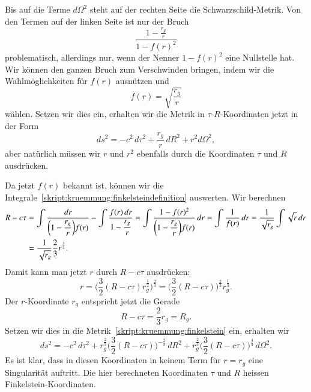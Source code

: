 Bis auf die Terme $d\Omega^2$ steht auf der rechten Seite die
Schwarzschild-Metrik.
Von den Termen auf der linken Seite ist nur der Bruch
\[
\frac{\displaystyle 1-\frac{r_g}{r}}{1-f(r)^2}
\]
problematisch, allerdings nur, wenn der Nenner $1-f(r)^2$ eine
Nullstelle hat.
Wir können den ganzen Bruch zum Verschwinden bringen, indem wir die
Wahlmöglichkeiten für $f(r)$ ausnützen und 
\[
f(r)=\sqrt{\frac{r_g}{r}}
\]
wählen.
Setzen wir dies ein, erhalten wir die Metrik in $\tau$-$R$-Koordinaten
jetzt in der Form
\begin{equation}
ds^2
=
-c^2\,d\tau^2 + \frac{r_g}{r}\,dR^2 + r^2 d\Omega^2,
\label{skript:kruemmung:finkelstein}
\end{equation}
aber natürlich müssen wir $r$ und $r^2$ ebenfalls durch die Koordinaten
$\tau$ und $R$ ausdrücken.

Da jetzt $f(r)$ bekannt ist, können wir die
Integrale~\eqref{skript:kruemmung:finkelsteindefinition} auswerten.
Wir berechnen
\begin{align*}
R-c\tau
&=
\int\frac{dr}{\displaystyle \biggl(1-\frac{r_g}{r}\biggr)f(r)}
- \int\frac{f(r)\,dr}{\displaystyle 1-\frac{r_g}{r}}
=
\int\frac{1-f(r)^2}{\displaystyle\biggl(1-\frac{r_g}{r}\biggr) f(r)}\,dr
=
\int\frac{1}{f(r)}\,dr
=
\frac{1}{\sqrt{\mathstrut r_g}}\int\sqrt{\mathstrut r}\,dr
\\
&=
\frac{1}{\sqrt{\mathstrut r_g}} \frac{2}{3}r^{\frac{3}{2}}.
\end{align*}
Damit kann man jetzt $r$ durch $R-c\tau$ ausdrücken:
\begin{equation}
r
=
\biggl(\frac{3}{2}(R-c\tau)r_g^{\frac{1}{2}}\biggr)^{\frac23}
=
\biggl(\frac{3}{2}(R-c\tau)\biggr)^{\frac23} r_g^{\frac13}.
\label{skript:kruemmung:finkelsteinr}
\end{equation}
Der $r$-Koordinate $r_g$ entspricht jetzt die Gerade
\[
R-c\tau = \frac23 r_g = R_g.
\]
Setzen wir dies in die Metrik~\eqref{skript:kruemmung:finkelstein}
ein, erhalten wir
\[
ds^2
=
-c^2 \,d\tau^2
+r_g^{\frac23}\biggl(\frac32(R-c\tau)\biggr)^{-\frac23}\,dR^2
+ r_g^{\frac23}\biggl(\frac32(R-c\tau)\biggr)^{\frac43}\,d\Omega^2.
\]
Es ist klar, dass in diesen Koordinaten in keinem Term für $r=r_g$
eine Singularität auftritt.
Die hier berechneten Koordinaten $\tau$ und $R$ heissen
Finkelstein-Koordinaten.

